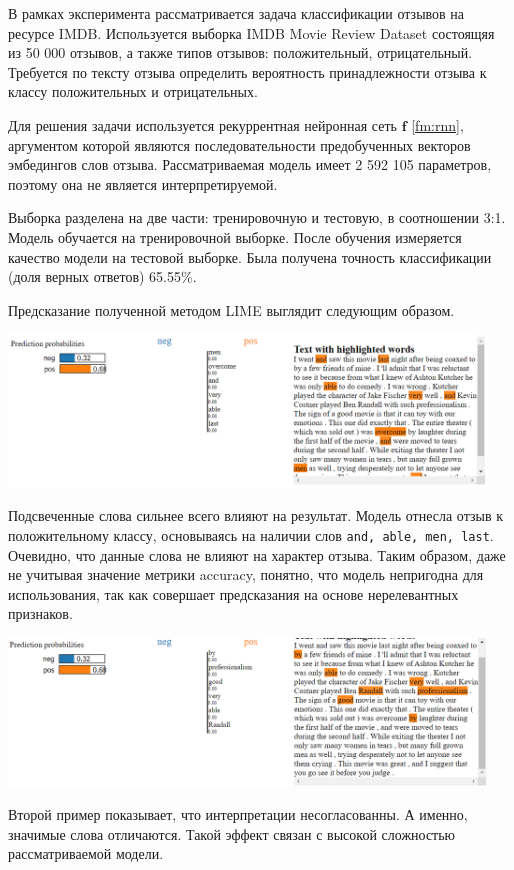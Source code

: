 \documentclass[a4paper, 12pt]{article}
\begin{document}
В рамках эксперимента рассматривается задача классификации отзывов на ресурсе IMDB. Используется выборка IMDB Movie Review Dataset \cite{maas-EtAl:2011:ACL-HLT2011} состоящяя из 50 000 отзывов, а также типов отзывов: положительный, отрицательный. Требуется по тексту отзыва определить вероятность принадлежности отзыва к классу положительных и отрицательных.

Для решения задачи используется рекуррентная нейронная сеть $\mathbf{f}$ \eqref{fm:rnn},
аргументом которой являются последовательности предобученных векторов эмбедингов слов отзыва. Рассматриваемая модель имеет 2 592 105 параметров, поэтому она не является интерпретируемой.

Выборка разделена на две части: тренировочную и тестовую, в соотношении 3:1. Модель обучается на тренировочной выборке. После обучения измеряется качество модели на тестовой выборке. Была получена точность классификации (доля верных ответов) 65.55\%.

Предсказание полученной методом LIME выглядит следующим образом.

\includegraphics[width=0.95\textwidth]{figures/lime_exp.png}

Подсвеченные слова сильнее всего влияют на результат. Модель отнесла отзыв к положительному классу, основываясь на наличии слов \texttt{and, able, men, last}. Очевидно, что данные слова не влияют на характер отзыва. Таким образом, даже не учитывая значение метрики accuracy, понятно, что модель непригодна для использования, так как совершает предсказания на основе нерелевантных признаков.

\includegraphics[width=0.95\textwidth]{figures/lime_exp2.png}

Второй пример показывает, что интерпретации несогласованны. А именно, значимые слова отличаются. Такой эффект связан с высокой сложностью рассматриваемой модели.
\end{document}
